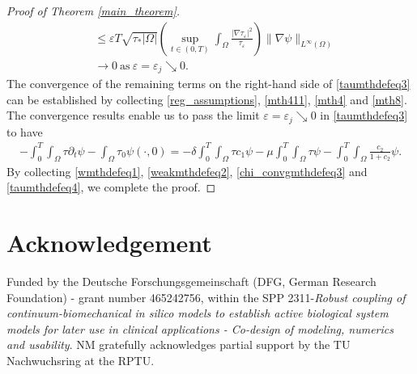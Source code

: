 \documentclass[a4paper,10pt]{article}
\theoremstyle{definition}
\begin{document}
\begin{proof}[Proof of Theorem \ref{main_theorem}]
\begin{align}
  \nonumber  & \leq \varepsilon T \sqrt{\tau_\ast |\Omega|}\left(\sup_{t \in (0, T)}  \int_\Omega\frac{|\nabla \tau_\varepsilon|^2}{\tau_\varepsilon}\right) \|\nabla \psi\|_{L^\infty(\Omega)}  \\[5pt]
  & \to 0 ~\text{as}~ \varepsilon = \varepsilon_j \searrow 0.
\end{align}
The convergence of the remaining terms on the right-hand side of \eqref{taumthdefeq3} can be established by collecting \eqref{reg_assumptions}, \eqref{mth411}, \eqref{mth4} and \eqref{mth8}. The convergence results  enable us to pass the limit $\varepsilon = \varepsilon_j \searrow 0$ in \eqref{taumthdefeq3} to have
\begin{align}
   \label{taumthdefeq4}
   - \int_0^T \int_\Omega \tau \partial_t \psi - \int_\Omega \tau_{0} \psi(\cdot, 0) = - \delta \int_0^T \int_\Omega \tau c_{1} \psi - \mu \int_0^T \int_\Omega \tau \psi - \int_0^T \int_\Omega \frac{c_{2}}{1 + c_{2}} \psi .
\end{align}
By collecting \eqref{wmthdefeq1}, \eqref{weakmthdefeq2}, \eqref{chi_convgmthdefeq3} and \eqref{taumthdefeq4}, we complete the proof.
\end{proof}



\section*{Acknowledgement}
Funded by the Deutsche Forschungsgemeinschaft (DFG, German Research Foundation) - grant number 465242756, within the SPP 2311-\textit{Robust coupling of continuum-biomechanical in silico models to establish active biological system models for later use in clinical applications - Co-design of modeling, numerics and usability}. NM gratefully acknowledges partial support by the TU Nachwuchsring at the RPTU.






\printbibliography
\end{document}
